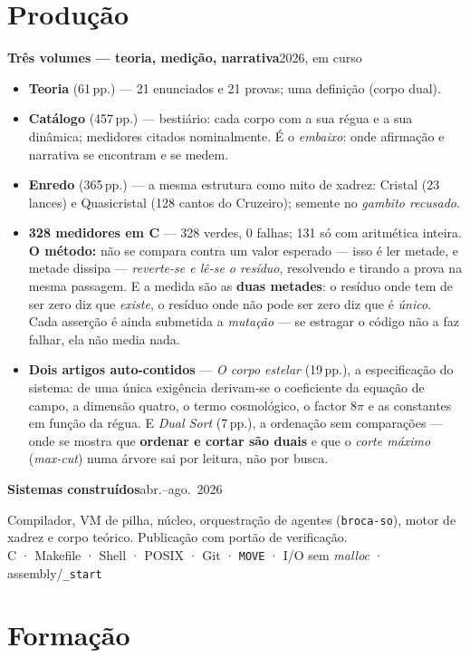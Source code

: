 \documentclass[11pt,a4paper]{article}
\newcommand{\lin}[2]{\noindent\textbf{#1}\hfill{\color{cinza}\small #2}\par}
\begin{document}
\section*{Produção}

\lin{Três volumes --- teoria, medição, narrativa}{2026, em curso}
\begin{itemize}
\item \textbf{Teoria} (61\,pp.) --- 21 enunciados e 21 provas; uma definição (corpo dual).
\item \textbf{Catálogo} (457\,pp.) --- bestiário: cada corpo com a sua régua e a sua dinâmica;
medidores citados nominalmente. É o \emph{embaixo}: onde afirmação e narrativa se encontram
e se medem.
\item \textbf{Enredo} (365\,pp.) --- a mesma estrutura como mito de xadrez: Cristal (23 lances)
e Quasicristal (128 cantos do Cruzeiro); semente no \emph{gambito recusado}.
\item \textbf{328 medidores em C} --- 328 verdes, 0 falhas; 131 só com aritmética inteira.
\textbf{O método:} não se compara contra um valor esperado --- isso é ler metade, e metade dissipa
--- \emph{reverte-se e lê-se o resíduo}, resolvendo e tirando a prova na mesma passagem. E a medida
são as \textbf{duas metades}: o resíduo onde tem de ser zero diz que \emph{existe}, o resíduo onde
não pode ser zero diz que é \emph{único}. Cada asserção é ainda submetida a \emph{mutação} --- se
estragar o código não a faz falhar, ela não media nada.
\item \textbf{Dois artigos auto-contidos} --- \emph{O corpo estelar} (19\,pp.), a especificação do
sistema: de uma única exigência derivam-se o coeficiente da equação de campo, a dimensão quatro, o
termo cosmológico, o factor $8\pi$ e as constantes em função da régua. E \emph{Dual Sort} (7\,pp.),
a ordenação sem comparações --- onde se mostra que \textbf{ordenar e cortar são duais} e que o
\emph{corte máximo} (\emph{max-cut}) numa árvore sai por leitura, não por busca.
\end{itemize}

\smallskip
\lin{Sistemas construídos}{abr.--ago.\ 2026}
Compilador, VM de pilha, núcleo, orquestração de agentes (\texttt{broca-so}), motor de
xadrez e corpo teórico. Publicação com portão de verificação.
\\[1pt]
{\small\color{cinza}C · Makefile · Shell · POSIX · Git · \texttt{MOVE} · I/O sem \emph{malloc}
· assembly/\texttt{\_start}}

\section*{Formação}
\end{document}
